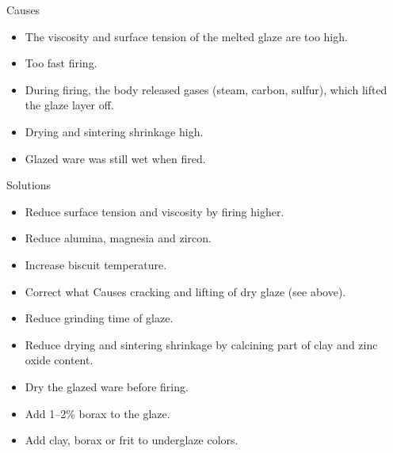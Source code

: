 Causes
\begin{itemize}
\item The viscosity and surface tension of the melted glaze are too high.
\item Too fast firing.
\item During firing, the body released gases (steam, carbon, sulfur), which 
lifted 
the glaze layer off.
\item Drying and sintering shrinkage high.
\item Glazed ware was still wet when fired.
\end{itemize}
Solutions
\begin{itemize}
\item Reduce surface tension and viscosity by firing higher.
\item Reduce alumina, magnesia and zircon.
\item Increase biscuit temperature.
\item Correct what Causes cracking and lifting of dry glaze (see above).
\item Reduce grinding time of glaze.
\item Reduce drying and sintering shrinkage by calcining part of clay and zinc 
oxide content.
\item Dry the glazed ware before firing.
\item Add 1--2\% borax to the glaze.
\item Add clay, borax or frit to underglaze colors.
\end{itemize}
